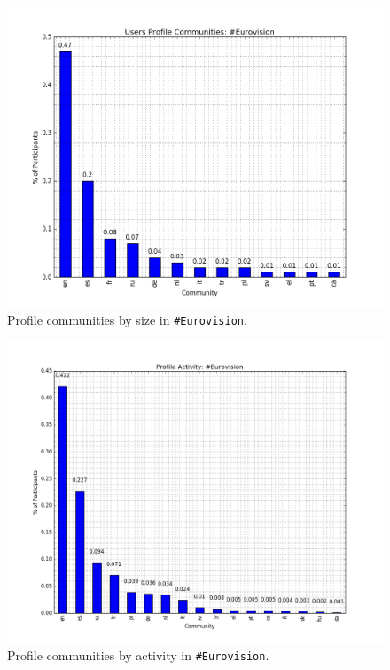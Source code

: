 \begin{figure}[htb]
\centering
\includegraphics[width=\columnwidth]{images/eurovision_profile_size.png}
\caption{Profile communities by size in {\texttt{\#Eurovision}}.}
\label{fig:eurovisionprofilesize}
\end{figure}

\begin{figure}[htb]
\centering
\includegraphics[width=\columnwidth]{images/eurovision_profile_activity.png}
\caption{Profile communities by activity in {\texttt{\#Eurovision}}.}
\label{fig:eurovisionprofileactivity}
\end{figure}

